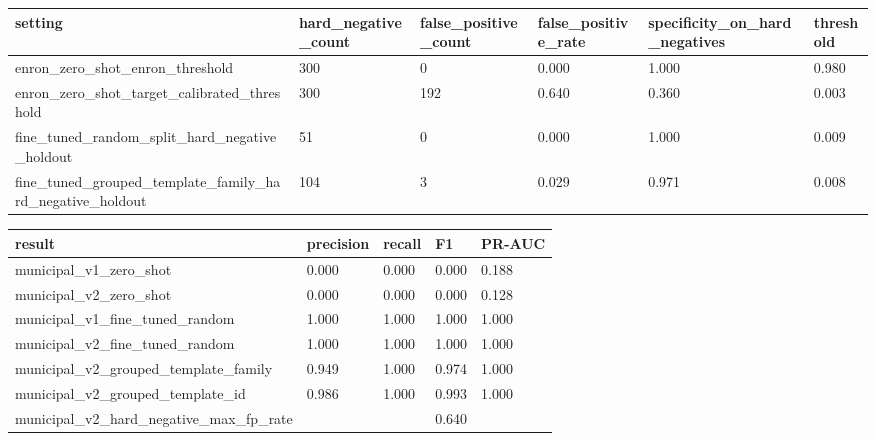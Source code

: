 
\begin{tabular}{llllll}
\hline
setting & hard\_negative\_count & false\_positive\_count & false\_positive\_rate & specificity\_on\_hard\_negatives & threshold \\
\hline
enron\_zero\_shot\_enron\_threshold & 300 & 0 & 0.000 & 1.000 & 0.980 \\
enron\_zero\_shot\_target\_calibrated\_threshold & 300 & 192 & 0.640 & 0.360 & 0.003 \\
fine\_tuned\_random\_split\_hard\_negative\_holdout & 51 & 0 & 0.000 & 1.000 & 0.009 \\
fine\_tuned\_grouped\_template\_family\_hard\_negative\_holdout & 104 & 3 & 0.029 & 0.971 & 0.008 \\
\hline
\end{tabular}



\begin{tabular}{lllll}
\hline
result & precision & recall & F1 & PR-AUC \\
\hline
municipal\_v1\_zero\_shot & 0.000 & 0.000 & 0.000 & 0.188 \\
municipal\_v2\_zero\_shot & 0.000 & 0.000 & 0.000 & 0.128 \\
municipal\_v1\_fine\_tuned\_random & 1.000 & 1.000 & 1.000 & 1.000 \\
municipal\_v2\_fine\_tuned\_random & 1.000 & 1.000 & 1.000 & 1.000 \\
municipal\_v2\_grouped\_template\_family & 0.949 & 1.000 & 0.974 & 1.000 \\
municipal\_v2\_grouped\_template\_id & 0.986 & 1.000 & 0.993 & 1.000 \\
municipal\_v2\_hard\_negative\_max\_fp\_rate &  &  & 0.640 &  \\
\hline
\end{tabular}

